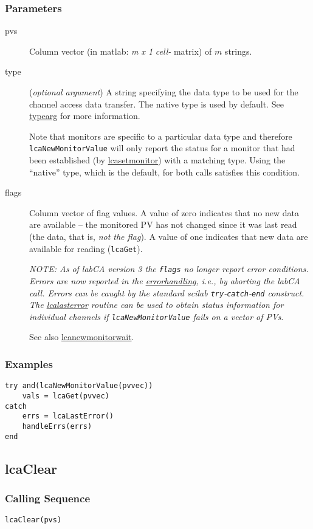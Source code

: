 \documentclass{article}
\newcommand{\sca}{\ita{labCA}}
\newcommand{\scilab}{\ita{scilab}}
\newcommand{\com}[1]{{\tt #1}}
\newcommand{\pbrk}{\pagebreak[3]}
\newcommand{\comref}[2]{\hyperref{\com{#1}}{\com{#1} (see }{)}{#2}}
\newcommand{\ita}[1]{\emph{#1}}
\newcommand{\m}{$m$}
\newcommand{\mhack}{$m$} %
\newcommand{\mxl}{$m\times 1$}
\renewcommand{\m}{\ita{m}}
\newcommand{\mhack}{\ita{m}} %
\renewcommand{\mxl}{\ita{m x 1}}
\renewcommand{\pbrk}{}
\newcommand{\PVITEM}{
\item[pvs] Column vector (in matlab: \mxl{} \ita{cell-} matrix)
of \mhack{} strings.
}
\begin{document}
\subsubsection{Parameters}
\begin{description}
\PVITEM
\item[type]
(\ita{optional argument}) A string specifying the
data type to be used for the channel access data transfer. The
native type is used by default.
See \hyperref{here}{(}{)}{typearg} for more information.

Note that monitors are specific to a particular data type and therefore
\com{lcaNewMonitorValue} will only report the status for a monitor that had been established
(by \comref{lcaSetMonitor}{lcasetmonitor}) with a matching type.
Using the ``native'' type, which is the default, for both calls
satisfies this condition.
\item[flags]
Column vector of flag values. A value of zero indicates that no new data are available --
the monitored PV has not changed since it was last read (the data, that is, {\em not the flag}).
A value of one indicates that new data are available for reading (\com{lcaGet}).

{\em NOTE: As of \sca{} version 3 the \com{flags} no longer report error conditions.
Errors are now reported in the 
\hyperref{standard way}{standard way (see~}{)}{errorhandling},
i.e., by aborting the \sca{} call.
Errors can be caught by the standard \scilab{} \com{try}-\com{catch}-\com{end}
construct. The \comref{lcaLastError}{lcalasterror} routine can be used to obtain
status information for individual channels if \com{lcaNewMonitorValue} fails on
a vector of PVs.}

See also \comref{lcaNewMonitorWait}{lcanewmonitorwait}.
\end{description}
\subsubsection{Examples}
\begin{verbatim}
try and(lcaNewMonitorValue(pvvec))
	vals = lcaGet(pvvec)
catch
    errs = lcaLastError()
	handleErrs(errs)
end
\end{verbatim}

\pbrk
\subsection{lcaClear}
\label{lcaclear}
\subsubsection{Calling Sequence}
\begin{verbatim}
lcaClear(pvs)
\end{verbatim}
\end{document}
